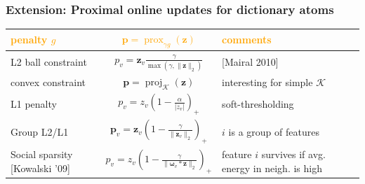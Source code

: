 \documentclass{beamer}
\def\B#1{\mathbf{#1}}
\def\emph#1{\textbf{\textcolor{orange}{#1}}}
\DeclareMathOperator{\prox}{prox}
\DeclareMathOperator{\proj}{proj}
\newcommand{\mycite}[1]{\textcolor{myblue}{[#1]}}
\begin{document}
\begin{frame}
  \frametitle{Extension: Proximal online updates for dictionary atoms}
  \vspace{-2em}
\begin{table}[H]
  \begin{tabular}{p{}|c|p{13cm}}\hline
    \emph{penalty $g$} & \emph{$\B{p} = \prox_{\gamma g}(\B{z})$} & \emph{comments}\\\hline
    L2 ball constraint & $p_v = \B{z}_v\frac{\gamma}{\max(\gamma,\|\B{z}\|_2)}$ & \mycite{Mairal 2010}\\ \hline
    convex constraint & $\B{p} = \proj_{\mathcal K}(\B{z})$ & interesting for simple $\mathcal K$\\ \hline
    L1 penalty & $p_v = z_v\left(1 - \frac{\alpha}{|z_v|}\right)_+$ & soft-thresholding \\\hline
    Group L2/L1 & $\B{p}_v = \B{z}_v\left(1 - \frac{\gamma}{\|\B{z}_v\|_2}\right)_+$ & $i$ is a group of features\\\hline
    Social sparsity \newline \mycite{Kowalski '09} & $p_v = z_v\left(1 - \frac{\gamma}{\|\boldsymbol{\omega}_v * \B{z}\|_2}\right)_+$
                                                    & feature $i$ survives if avg. \newline energy in neigh. is high\\\hline
  \end{tabular}
\end{table}


\end{frame}
\end{document}
